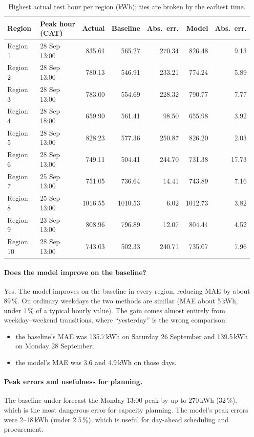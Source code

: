 \documentclass[11pt,a4paper]{article}
\begin{document}
\begin{table}[H]\centering\small
\begin{tabular}{llrrrrr}\toprule
Region & Peak hour (CAT) & Actual & Baseline & Abs.\ err. & Model & Abs.\ err.\\\midrule
Region 1 & 28 Sep 13:00 & 835.61 & 565.27 & 270.34 & 826.48 & 9.13\\
Region 2 & 28 Sep 13:00 & 780.13 & 546.91 & 233.21 & 774.24 & 5.89\\
Region 3 & 28 Sep 13:00 & 783.00 & 554.69 & 228.32 & 790.77 & 7.77\\
Region 4 & 28 Sep 18:00 & 659.90 & 561.41 & 98.50 & 655.98 & 3.92\\
Region 5 & 28 Sep 13:00 & 828.23 & 577.36 & 250.87 & 826.20 & 2.03\\
Region 6 & 28 Sep 13:00 & 749.11 & 504.41 & 244.70 & 731.38 & 17.73\\
Region 7 & 25 Sep 13:00 & 751.05 & 736.64 & 14.41 & 743.89 & 7.16\\
Region 8 & 25 Sep 13:00 & 1016.55 & 1010.53 & 6.02 & 1012.73 & 3.82\\
Region 9 & 23 Sep 13:00 & 808.96 & 796.89 & 12.07 & 804.44 & 4.52\\
Region 10 & 28 Sep 13:00 & 743.03 & 502.33 & 240.71 & 735.07 & 7.96\\\bottomrule
\end{tabular}
\caption{Highest actual test hour per region (kWh); ties are broken by the earliest time.}
\end{table}

\paragraph{Does the model improve on the baseline?}
Yes. The model improves on the baseline in every region, reducing MAE by about 89\,\%.
On ordinary weekdays the two methods are similar (MAE about 5\,kWh, under 1\,\% of a
typical hourly value). The gain comes almost entirely from weekday--weekend
transitions, where ``yesterday'' is the wrong comparison:
\begin{itemize}
\item the baseline's MAE was 135.7\,kWh on Saturday 26 September and 139.5\,kWh on
Monday 28 September;
\item the model's MAE was 3.6 and 4.9\,kWh on those days.
\end{itemize}

\paragraph{Peak errors and usefulness for planning.}
The baseline under-forecast the Monday 13:00 peak by up to 270\,kWh (32\,\%), which is
the most dangerous error for capacity planning. The model's peak errors were
2--18\,kWh (under 2.5\,\%), which is useful for day-ahead scheduling and procurement.
\end{document}
